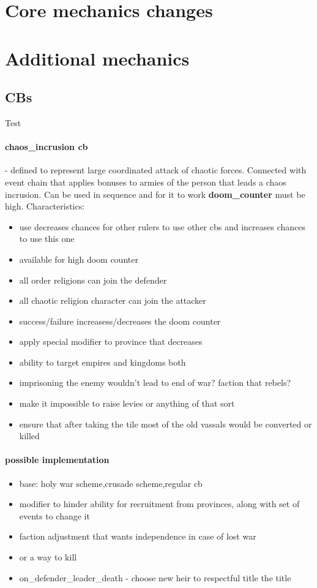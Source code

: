 \documentclass[10pt, english]{article}
\author{Piotr<elminister@interia.pl>}
\begin{document}
\section{Core mechanics changes}
\section{Additional mechanics}
\subsection{CBs}
Test
\paragraph{chaos\_incrusion cb} - defined to represent large coordinated attack 
of chaotic forces.
Connected with event chain that applies bonuses to armies of the person that leads a 
chaos incrusion.
Can be used in sequence and for it to work \textbf{doom\_counter} must be high.
Characteristics:
\begin{itemize}
\item use decreases chances for other rulers to use other cbs and increases chances to use this one
\item available for high doom counter
\item all order religions can join the defender
\item all chaotic religion character can join the attacker
\item success/failure increasess/decreases the doom counter
\item apply special modifier to province that decreases 
\item ability to target empires and kingdoms both
\item imprisoning the enemy wouldn't lead to end of war? faction that rebels?
\item make it impossible to raise levies or anything of that sort
\item ensure that after taking the tile most of the old vassals would be converted or killed
\end{itemize}

\paragraph{possible implementation}
\begin{itemize}
\item base: holy war scheme,crusade scheme,regular cb
\item modifier to hinder ability for recruitment from provinces, along with set of events
      to change it
\item faction adjustment that wants independence in case of lost war
\item or a way to kill 
\item on\_defender\_leader\_death - choose new heir to respectful title the title
\end{itemize}
\end{document}

